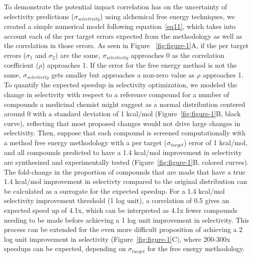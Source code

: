 \documentclass[9pt,lineno]{elife-modified} %
\begin{document}
To demonstrate the potential impact correlation has on the uncertainty of selectivity predictions ($\sigma_{selectivity}$) using alchemical free energy techniques, we created a simple numerical model following equation~\ref{eq11}, which takes into account each of the per target errors expected from the methodology as well as the correlation in those errors. As seen in Figure ~\ref{fig:figure-1}A, if the per target errors ($\sigma_1$ and $\sigma_2$) are the same, $\sigma_{selectivity}$ approaches 0 as the correlation coefficient ($\rho$) approaches 1. If the error for the free energy method is not the same, $\sigma_{selectivity}$ gets smaller but approaches a non-zero value as $\rho$ approaches 1. 
To quantify the expected speedup in selectivity optimization, we modeled the change in selectivity with respect to a reference compound for a number of compounds a medicinal chemist might suggest as a normal distribution centered around 0 with a standard deviation of 1 kcal/mol (Figure~\ref{fig:figure-1}B, black curve), reflecting that most proposed changes would not drive large changes in selectivity. Then, suppose that each compound is screened computationally with a method free energy methodology with a per target ($\sigma_{target}$) error of 1 kcal/mol, and all compounds predicted to have a 1.4 kcal/mol improvement in selectivity are synthesized and experimentally tested (Figure~\ref{fig:figure-1}B, colored curves). The fold-change in the proportion of compounds that are made that have a true 1.4 kcal/mol improvement in selectivty compared to the original distribution can be calculated as a surrogate for the expected speedup. For a 1.4 kcal/mol selectivity improvement threshold (1 log unit), a correlation of 0.5 gives an expected speed up of 4.1x, which can be interpreted as 4.1x fewer compounds needing to be made before achieving a 1 log unit improvement in selectivity. This process can be extended for the even more difficult proposition of achieving a 2 log unit improvement in selectivity (Figure~\ref{fig:figure-1}C), where 200-300x speedups can be expected, depending on $\sigma_{target}$ for the free energy methodology. 
\end{document}
